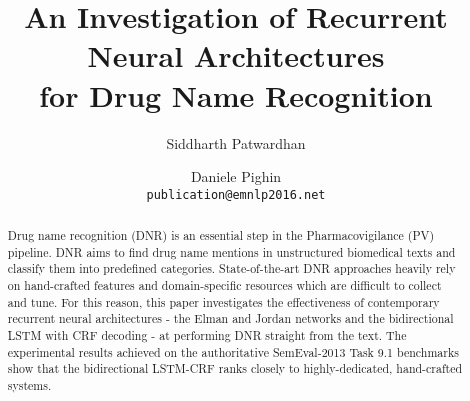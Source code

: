 \documentclass[11pt,letterpaper]{article}
\title{An Investigation of Recurrent  Neural  Architectures \\ for Drug Name Recognition}
\author{Siddharth Patwardhan \and Daniele Pighin\\
  {\tt publication@emnlp2016.net}}
\date{}
\begin{document}
\maketitle

\begin{abstract}
Drug name recognition (DNR) is an essential step in the Pharmacovigilance (PV) pipeline. DNR aims to find drug name mentions in unstructured biomedical texts and classify them into predefined categories. State-of-the-art DNR approaches heavily rely on hand-crafted features and domain-specific resources which are difficult to collect and tune. For this reason, this paper investigates the effectiveness of contemporary recurrent neural architectures - the Elman and Jordan networks and the bidirectional LSTM with CRF decoding - at performing DNR straight from the text. The experimental results achieved on the authoritative SemEval-2013 Task 9.1 benchmarks show that the bidirectional LSTM-CRF ranks closely to highly-dedicated, hand-crafted systems.
\end{abstract}
\end{document}
